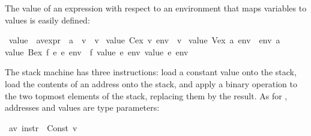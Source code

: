 \begin{isabellebody}
\begin{isamarkuptext}
The value of an expression with respect to an environment that maps variables to
values is easily defined:%
\end{isamarkuptext}%
\isamarkuptrue%
\isamarkupfalse%
\ {}value{}\ {}{}\ {}{}{}a{}{}v{}expr\ {}\ {}{}a\ {}\ {}v{}\ {}\ {}v{}\ \isanewline
{}value\ {}Cex\ v{}\ env\ {}\ v{}\ {}\isanewline
{}value\ {}Vex\ a{}\ env\ {}\ env\ a{}\ {}\isanewline
{}value\ {}Bex\ f\ e{}\ e{}{}\ env\ {}\ f\ {}value\ e{}\ env{}\ {}value\ e{}\ env{}{}%
\begin{isamarkuptext}%
The stack machine has three instructions: load a constant value onto the
stack, load the contents of an address onto the stack, and apply a
binary operation to the two topmost elements of the stack, replacing them by
the result. As for , addresses and values are type parameters:%
\end{isamarkuptext}%
\isamarkuptrue%
\isamarkupfalse%
\ {}{}a{}{}v{}\ instr\ {}\ Const\ {}v\isanewline

\end{isabellebody}
